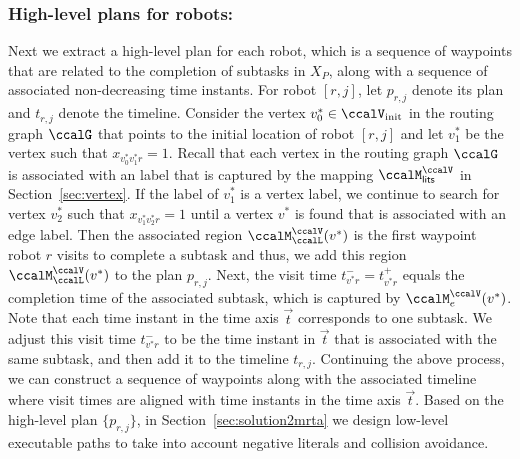 \documentclass[Afour,sageh,times]{sagej}
\begin{document}
{{{  \subsubsection{High-level plans for robots:} Next we extract a high-level plan for each robot, which is a sequence of waypoints that are related  to  the completion of subtasks in $X_P$, along with a sequence of associated non-decreasing time instants. For robot $[r,j]$, let $p_{r,j}$ denote its plan and $t_{r,j}$ denote the  timeline. Consider the vertex $v^*_0 \in \ccalV_{\text{init}}$ in the routing graph $\ccalG$ that points to the initial location of  robot $[r,j]$  and let $v^*_1$ be the vertex such that $x_{v^*_0 v^*_1 r} =1$. Recall that each vertex in the routing graph $\ccalG$ is associated with an label that is captured by the mapping $\ccalM_{\mathsf{lits}}^{\ccalV}$ in Section~\ref{sec:vertex}. If the label of $v_1^*$ is a vertex label, we continue to search for vertex $v_2^*$ such that $x_{v_1^* v_2^* r}=1$ until a vertex $v^*$ is found that is associated with an edge label. Then the associated region  $\ccalM^\ccalV_{\ccalL}(v^*)$ is the first waypoint robot $r$ visits to complete a subtask and thus, we add this region $\ccalM^\ccalV_{\ccalL}(v^*)$ to the plan $p_{r,j}$. Next, the visit time  $t^-_{v^* r} = t^+_{v^* r}$ equals the completion time of the associated subtask, which is captured by $\ccalM_{e}^{\ccalV}(v^*)$. Note that each time instant in the time axis $\vec{t}$ corresponds to one subtask.  We adjust this visit time $t^-_{v^* r}$ to be the time instant in $\vec{t}$ that is associated with the same subtask, and then add it to the timeline $t_{r,j}$.   Continuing the above process, we can construct a sequence of waypoints along with the associated timeline where visit times are aligned with time instants in the time axis $\vec{t}$. Based on the high-level plan $\{p_{r,j}\}$, in Section~\ref{sec:solution2mrta} we design low-level executable paths to take into account negative literals and collision avoidance.

}}}
\end{document}
